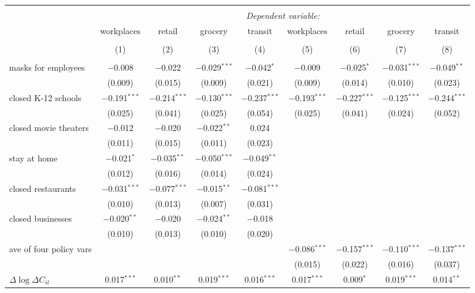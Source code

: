 \begin{tabular}{@{\extracolsep{1pt}}lcccccccc} 
\\[-1.8ex]\hline 
\hline \\[-1.8ex] 
 & \multicolumn{8}{c}{\textit{Dependent variable:}} \\ 
\cline{2-9} 
 & workplaces & retail & grocery & transit & workplaces & retail & grocery & transit \\ 
\\[-1.8ex] & (1) & (2) & (3) & (4) & (5) & (6) & (7) & (8)\\ 
\hline \\[-1.8ex] 
 masks for employees & $-$0.008 & $-$0.022 & $-$0.029$^{***}$ & $-$0.042$^{*}$ & $-$0.009 & $-$0.025$^{*}$ & $-$0.031$^{***}$ & $-$0.049$^{**}$ \\ 
  & (0.009) & (0.015) & (0.009) & (0.021) & (0.009) & (0.014) & (0.010) & (0.023) \\ 
  closed K-12 schools & $-$0.191$^{***}$ & $-$0.214$^{***}$ & $-$0.130$^{***}$ & $-$0.237$^{***}$ & $-$0.193$^{***}$ & $-$0.227$^{***}$ & $-$0.125$^{***}$ & $-$0.244$^{***}$ \\ 
  & (0.025) & (0.041) & (0.025) & (0.054) & (0.025) & (0.041) & (0.024) & (0.052) \\ 
  closed movie theaters & $-$0.012 & $-$0.020 & $-$0.022$^{**}$ & 0.024 &  &  &  &  \\ 
  & (0.011) & (0.015) & (0.011) & (0.023) &  &  &  &  \\ 
  stay at home & $-$0.021$^{*}$ & $-$0.035$^{**}$ & $-$0.050$^{***}$ & $-$0.049$^{**}$ &  &  &  &  \\ 
  & (0.012) & (0.016) & (0.014) & (0.024) &  &  &  &  \\ 
  closed restaurants & $-$0.031$^{***}$ & $-$0.077$^{***}$ & $-$0.015$^{**}$ & $-$0.081$^{***}$ &  &  &  &  \\ 
  & (0.010) & (0.013) & (0.007) & (0.031) &  &  &  &  \\ 
  closed businesses & $-$0.020$^{**}$ & $-$0.020 & $-$0.024$^{**}$ & $-$0.018 &  &  &  &  \\ 
  & (0.010) & (0.013) & (0.010) & (0.020) &  &  &  &  \\ 
  ave of four policy vars &  &  &  &  & $-$0.086$^{***}$ & $-$0.157$^{***}$ & $-$0.110$^{***}$ & $-$0.137$^{***}$ \\ 
  &  &  &  &  & (0.015) & (0.022) & (0.016) & (0.037) \\ 
  $\Delta \log \Delta C_{it}$ & 0.017$^{***}$ & 0.010$^{**}$ & 0.019$^{***}$ & 0.016$^{***}$ & 0.017$^{***}$ & 0.009$^{*}$ & 0.019$^{***}$ & 0.014$^{**}$ \\ 

\end{tabular}
